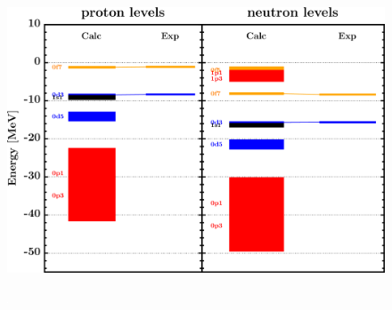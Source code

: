\documentclass[twocolumn,secnumarabic,amssymb, nobibnotes, aps, prl,
superscriptaddress, nobalancelastpage]{revtex4}
\begin{document}
\begin{figure}[!htb]
\begin{minipage}{0.4\linewidth}
        \label{DOM_ca40_chargeDensity}
    \end{minipage}
    \begin{minipage}{0.35\linewidth}
        \centering
        \includegraphics[width=\linewidth]{figures/ca40_SPLevels.png}
        \label{DOM_ca40_SPLevels}
    \end{minipage}
    \begin{minipage}{0.4\linewidth}
        \centering
        \includegraphics[width=\linewidth]{figures/ca40_RMSRadius.png}

\end{minipage}
\end{figure}
\end{document}
